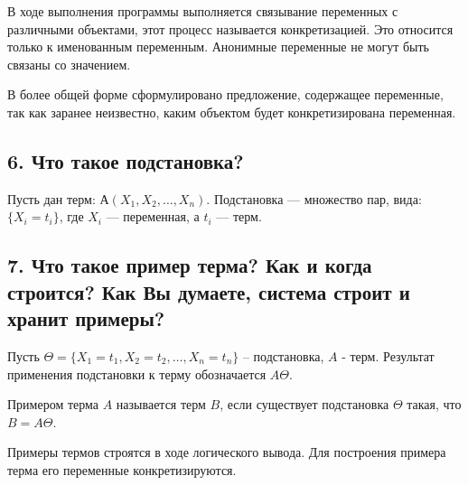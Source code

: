 В ходе выполнения программы выполняется связывание переменных с различными объектами, этот процесс называется конкретизацией. Это относится только к именованным переменным. Анонимные переменные не могут быть связаны со значением.

В более общей форме сформулировано предложение, содержащее переменные, так как заранее неизвестно, каким объектом будет конкретизирована переменная.

\subsection*{6. Что такое подстановка?}

Пусть дан терм: $А(X_1, X_2, \ldots , X_n)$.
Подстановка --- множество пар, вида: \\ $\{X _ i = t _ i\}$, где $X_i$ --- переменная, а $t_i$ --- терм.

\subsection*{7. Что такое пример терма? Как и когда строится? Как Вы думаете, система строит и хранит примеры?}

Пусть $\Theta =  \{X_1 = t_1, X_2= t_2, \dots , X_n = t_n \}$   –   подстановка, $A$ - терм. Результат применения подстановки к терму обозначается $A\Theta$.

Примером терма $A$ называется терм $B$, если существует подстановка $\Theta$ такая, что $B = A\Theta$.

Примеры термов строятся в ходе логического вывода. Для построения примера терма его переменные конкретизируются.

